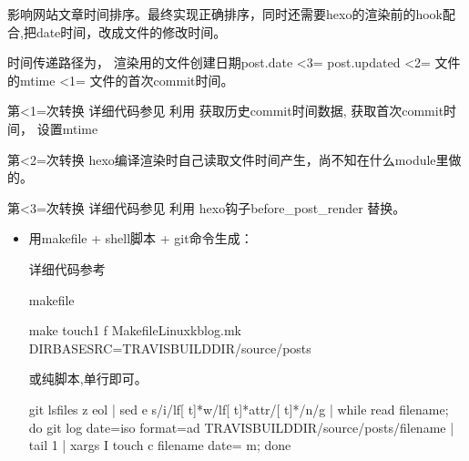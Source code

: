 \documentclass[letterpaper,12pt,english]{sphinxmanual}
\begin{document}
影响网站文章时间排序。最终实现正确排序，同时还需要hexo的渲染前的hook配合,把date时间，改成文件的修改时间。

时间传递路径为，
渲染用的文件创建日期post.date <3= post.updated <2= 文件的mtime <1= 文件的首次commit时间。

第<1=次转换
详细代码参见 
利用  获取历史commit时间数据,
 获取首次commit时间，
 设置mtime

第<2=次转换
hexo编译渲染时自己读取文件时间产生，尚不知在什么module里做的。

第<3=次转换
详细代码参见 
利用 hexo钩子before\_post\_render 替换。
\begin{itemize}
\item {} 
用makefile + shell脚本 + git命令生成：

详细代码参考 

makefile

\begin{sphinxVerbatim}[commandchars=\\\{\}]
make touch1 \PYGZhy{}f MakefileLinuxkblog.mk DIR\PYGZus{}BASE\PYGZus{}SRC=\PYGZdl{}TRAVIS\PYGZus{}BUILD\PYGZus{}DIR/source/\PYGZus{}posts
\end{sphinxVerbatim}

或纯脚本,单行即可。

\begin{sphinxVerbatim}[commandchars=\\\{\}]
git ls\PYGZhy{}files \PYGZhy{}z \PYGZhy{}\PYGZhy{}eol | sed \PYGZhy{}e \PYGZdq{}s/i\PYGZbs{}\PYGZbs{}/lf[ \PYGZbs{}\PYGZbs{}t]*w\PYGZbs{}\PYGZbs{}/lf[ \PYGZbs{}\PYGZbs{}t]*attr\PYGZbs{}\PYGZbs{}/[ \PYGZbs{}\PYGZbs{}t]*/\PYGZbs{}\PYGZbs{}n/g\PYGZdq{} | while read filename; do git log \PYGZhy{}\PYGZhy{}date=iso \PYGZhy{}\PYGZhy{}format=\PYGZdq{}\PYGZpc{}ad\PYGZdq{} \PYGZhy{}\PYGZhy{} \PYGZdq{}\PYGZdl{}TRAVIS\PYGZus{}BUILD\PYGZus{}DIR/source/\PYGZus{}posts/\PYGZdl{}filename\PYGZdq{} | tail \PYGZhy{}1 | xargs \PYGZhy{}I\PYGZob{}\PYGZcb{} touch \PYGZhy{}c \PYGZdl{}filename \PYGZhy{}\PYGZhy{}date=\PYGZdq{}\PYGZob{}\PYGZcb{}\PYGZdq{} \PYGZhy{}m; done
\end{sphinxVerbatim}

\end{itemize}
\end{document}
